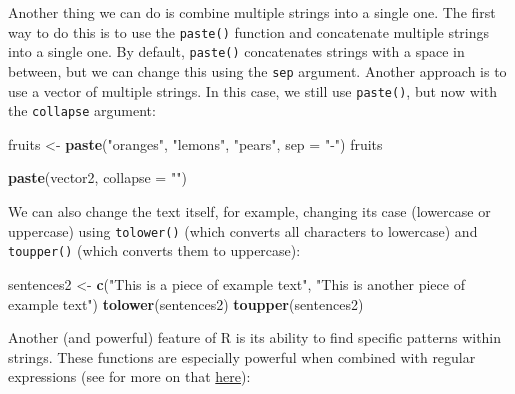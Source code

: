 \documentclass[
]{book}
\newenvironment{Shaded}{\begin{snugshade}}{\end{snugshade}}
\newcommand{\AttributeTok}[1]{\textcolor[rgb]{0.13,0.29,0.53}{#1}}
\newcommand{\FunctionTok}[1]{\textcolor[rgb]{0.13,0.29,0.53}{\textbf{#1}}}
\newcommand{\NormalTok}[1]{#1}
\newcommand{\OtherTok}[1]{\textcolor[rgb]{0.56,0.35,0.01}{#1}}
\newcommand{\StringTok}[1]{\textcolor[rgb]{0.31,0.60,0.02}{#1}}
\begin{document}
Another thing we can do is combine multiple strings into a single one. The first way to do this is to use the \texttt{paste()} function and concatenate multiple strings into a single one. By default, \texttt{paste()} concatenates strings with a space in between, but we can change this using the \texttt{sep} argument. Another approach is to use a vector of multiple strings. In this case, we still use \texttt{paste()}, but now with the \texttt{collapse} argument:

\begin{Shaded}
\begin{Highlighting}[]
\NormalTok{fruits }\OtherTok{\textless{}{-}} \FunctionTok{paste}\NormalTok{(}\StringTok{"oranges"}\NormalTok{, }\StringTok{"lemons"}\NormalTok{, }\StringTok{"pears"}\NormalTok{, }\AttributeTok{sep =} \StringTok{"{-}"}\NormalTok{)}
\NormalTok{fruits}

\FunctionTok{paste}\NormalTok{(vector2, }\AttributeTok{collapse =} \StringTok{""}\NormalTok{)}
\end{Highlighting}
\end{Shaded}

We can also change the text itself, for example, changing its case (lowercase or uppercase) using \texttt{tolower()} (which converts all characters to lowercase) and \texttt{toupper()} (which converts them to uppercase):

\begin{Shaded}
\begin{Highlighting}[]
\NormalTok{sentences2 }\OtherTok{\textless{}{-}} \FunctionTok{c}\NormalTok{(}\StringTok{"This is a piece of example text"}\NormalTok{, }\StringTok{"This is another piece of example text"}\NormalTok{)}
\FunctionTok{tolower}\NormalTok{(sentences2)}
\FunctionTok{toupper}\NormalTok{(sentences2)}
\end{Highlighting}
\end{Shaded}

Another (and powerful) feature of R is its ability to find specific patterns within strings. These functions are especially powerful when combined with regular expressions (see for more on that \href{https://en.wikipedia.org/wiki/Regular_expression}{here}):
\end{document}
